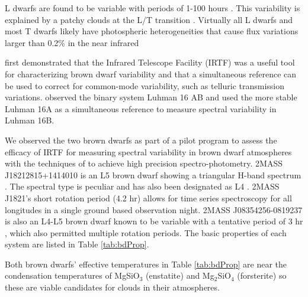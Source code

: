 \documentclass[twocolumn]{aastex6}
\begin{document}
L dwarfs are found to be variable with periods of 1-100 hours \citep{bailer-jones1999bdvar,bailer-jones1999varevo}.
This variability is explained by a patchy clouds at the L/T transition \citep{marley2010patchyc}.
Virtually all L dwarfs and most T dwarfs likely have photospheric heterogeneities that cause flux variations larger than 0.2\% in the near infrared \citep{metchev2015weatherII}

\citet{burgaser2014irtf} first demonstrated that the Infrared Telescope Facility (IRTF) was a useful tool for characterizing brown dwarf variability and that a simultaneous reference can be used to correct for common-mode variability, such as telluric transmission variations.
\citet{burgaser2014irtf} observed the binary system Luhman 16 AB and used the more stable Luhman 16A as a simultaneous reference to measure spectral variability in Luhman 16B.

We observed the two brown dwarfs as part of a pilot program to assess the efficacy of IRTF for measuring spectral variability in brown dwarf atmospheres with the techniques of \citet{schlawin2014} to achieve high precision spectro-photometry.
2MASS J18212815+1414010 is an L5 brown dwarf showing a triangular H-band spectrum \citep{looper2008peculiarLdwarfs}.
The spectral type is peculiar and has also been designated as L4 \citep{gagne2015banyan7}.
2MASS J1821's short rotation period (4.2 hr) allows for time series spectroscopy for all longitudes in a single ground based observation night.
2MASS J08354256-0819237 \citep{cruz2003coolNeighbors} is also an L4-L5 brown dwarf known to be variable with a tentative period of 3 hr \citep{koen2004ibandBD}, which also permitted multiple rotation periods.
The basic properties of each system are listed in Table \ref{tab:bdProp}.

Both brown dwarfs' effective temperatures in Table \ref{tab:bdProp} are near the condensation temperatures of MgSiO$_3$ (enstatite) and Mg$_2$SiO$_4$ (forsterite) \citep{marley2015rev} so these are viable candidates for clouds in their atmospheres.
\end{document}
